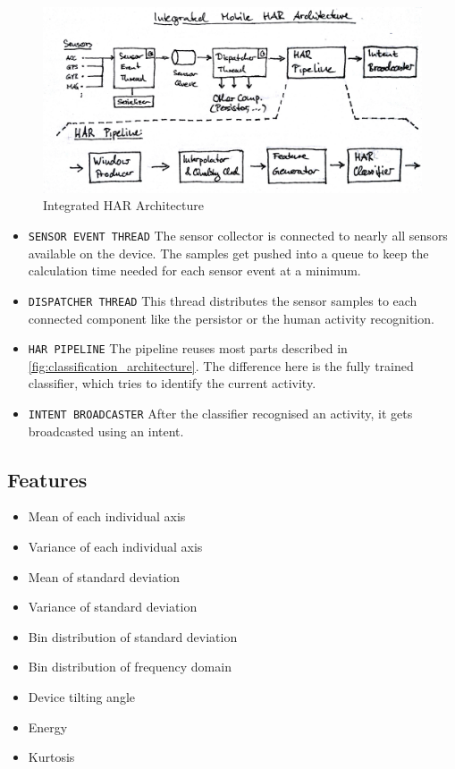 \begin{figure}[htbp]
\centering
\includegraphics[width=\textwidth]{img/har/integration.jpg}
\caption{Integrated HAR Architecture}\label{fig:integrated_har}
\end{figure}

\begin{itemize}
  \item \texttt{SENSOR EVENT THREAD} The sensor collector is connected to nearly
    all sensors available on the device. The samples get pushed into a queue to 
    keep the calculation time needed for each sensor event at a minimum.
  \item \texttt{DISPATCHER THREAD} This thread distributes the sensor samples to
    each connected component like the persistor or the human activity 
    recognition.
  \item \texttt{HAR PIPELINE} The pipeline reuses most parts described in 
    \ref{fig:classification_architecture}. The difference here is the fully 
    trained classifier, which tries to identify the current activity.
  \item \texttt{INTENT BROADCASTER} After the classifier recognised an activity,
    it gets broadcasted using an intent.
\end{itemize}


\subsection{Features}\label{sec:har_features}

\begin{itemize}
  \item Mean of each individual axis
  \item Variance of each individual axis
  \item Mean of standard deviation
  \item Variance of standard deviation
  \item Bin distribution of standard deviation
  \item Bin distribution of frequency domain
  \item Device tilting angle
  \item Energy
  \item Kurtosis
\end{itemize}


